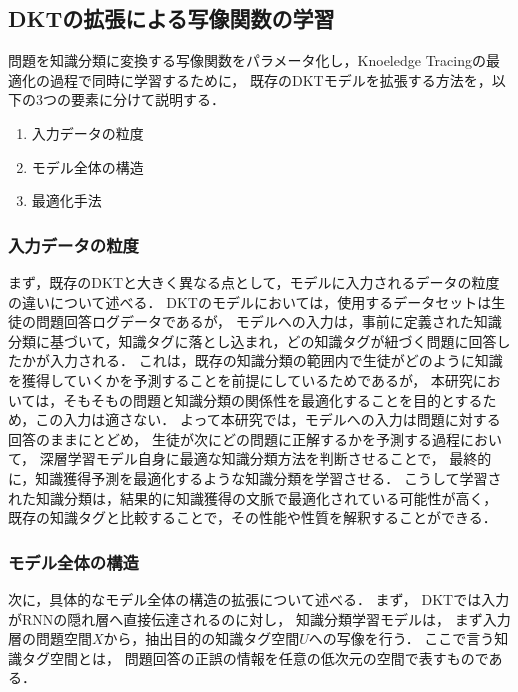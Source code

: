 

\subsection{DKTの拡張による写像関数の学習}
\label{sec:tag_learn}

問題を知識分類に変換する写像関数をパラメータ化し，Knoeledge Tracingの最適化の過程で同時に学習するために，
既存のDKTモデルを拡張する方法を，以下の3つの要素に分けて説明する．

\begin{enumerate}
	\item 入力データの粒度
	\item モデル全体の構造
	\item 最適化手法
\end{enumerate}


\subsubsection{入力データの粒度}
まず，既存のDKTと大きく異なる点として，モデルに入力されるデータの粒度の違いについて述べる．
DKTのモデルにおいては，使用するデータセットは生徒の問題回答ログデータであるが，
モデルへの入力は，事前に定義された知識分類に基づいて，知識タグに落とし込まれ，どの知識タグが紐づく問題に回答したかが入力される．
これは，既存の知識分類の範囲内で生徒がどのように知識を獲得していくかを予測することを前提にしているためであるが，
本研究においては，そもそもの問題と知識分類の関係性を最適化することを目的とするため，この入力は適さない．
よって本研究では，モデルへの入力は問題に対する回答のままにとどめ，
生徒が次にどの問題に正解するかを予測する過程において，
深層学習モデル自身に最適な知識分類方法を判断させることで，
最終的に，知識獲得予測を最適化するような知識分類を学習させる．
こうして学習された知識分類は，結果的に知識獲得の文脈で最適化されている可能性が高く，
既存の知識タグと比較することで，その性能や性質を解釈することができる．


\subsubsection{モデル全体の構造}
次に，具体的なモデル全体の構造の拡張について述べる．
まず，
DKTでは入力がRNNの隠れ層へ直接伝達されるのに対し，
知識分類学習モデルは，
まず入力層の問題空間$X$から，抽出目的の知識タグ空間$U$への写像を行う．
ここで言う知識タグ空間とは，
問題回答の正誤の情報を任意の低次元の空間で表すものである．

